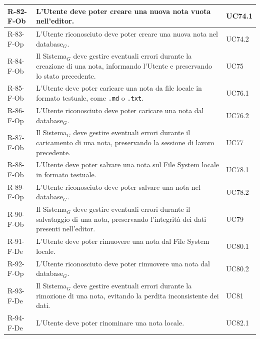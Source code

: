\documentclass[a4paper, 10pt]{article}
\begin{document}
\begin{longtable}{|p{2.2cm}|p{7.5cm}|p{4cm}|}
R-82-F-Ob & L'Utente deve poter creare una nuova nota vuota nell'editor. & UC74.1 \\ \hline

R-83-F-Op & L'Utente riconosciuto deve poter creare una nuova nota nel database$_G$. & UC74.2 \\ \hline

R-84-F-Ob & Il Sistema$_G$ deve gestire eventuali errori durante la creazione di una nota, informando l'Utente e preservando lo stato precedente. & UC75 \\ \hline

R-85-F-Ob & L'Utente deve poter caricare una nota da file locale in formato testuale, come \texttt{.md} o \texttt{.txt}. & UC76.1 \\ \hline

R-86-F-Op & L'Utente riconosciuto deve poter caricare una nota dal database$_G$. & UC76.2 \\ \hline

R-87-F-Ob & Il Sistema$_G$ deve gestire eventuali errori durante il caricamento di una nota, preservando la sessione di lavoro precedente. & UC77 \\ \hline

R-88-F-Ob & L'Utente deve poter salvare una nota sul File System locale in formato testuale. & UC78.1 \\ \hline

R-89-F-Op & L'Utente riconosciuto deve poter salvare una nota nel database$_G$. & UC78.2 \\ \hline

R-90-F-Ob & Il Sistema$_G$ deve gestire eventuali errori durante il salvataggio di una nota, preservando l'integrità dei dati presenti nell'editor. & UC79 \\ \hline

R-91-F-De & L'Utente deve poter rimuovere una nota dal File System locale. & UC80.1 \\ \hline

R-92-F-Op & L'Utente riconosciuto deve poter rimuovere una nota dal database$_G$. & UC80.2 \\ \hline

R-93-F-De & Il Sistema$_G$ deve gestire eventuali errori durante la rimozione di una nota, evitando la perdita inconsistente dei dati. & UC81 \\ \hline

R-94-F-De & L'Utente deve poter rinominare una nota locale. & UC82.1 \\ \hline


\end{longtable}
\end{document}
